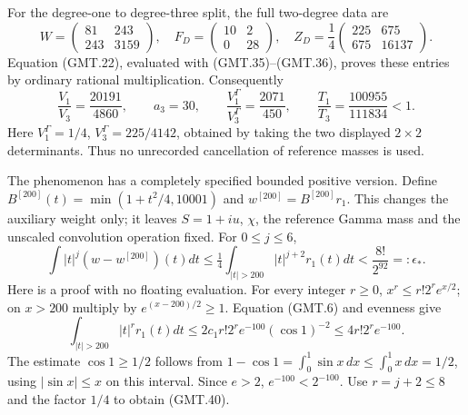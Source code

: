 \documentclass[11pt]{article}
\begin{document}
For the degree-one to degree-three split, the full two-degree data are
\[
 W=\begin{pmatrix}81&243\\243&3159\end{pmatrix},\quad
 F_D=\begin{pmatrix}10&2\\0&28\end{pmatrix},\quad
 Z_D=\frac14\begin{pmatrix}225&675\\675&16137\end{pmatrix}.
                                                                    \tag{GMT.38}
\]
Equation (GMT.22), evaluated with (GMT.35)--(GMT.36), proves these
entries by ordinary rational multiplication. Consequently
\[
 \frac{V_1}{V_3}=\frac{20191}{4860},\qquad a_3=30,
 \qquad\frac{V_1^\Gamma}{V_3^\Gamma}=\frac{2071}{450},\qquad
 \boxed{\frac{T_1}{T_3}=\frac{100955}{111834}<1.}               \tag{GMT.39}
\]
Here $V_1^\Gamma=1/4$, $V_3^\Gamma=225/4142$, obtained by
taking the two displayed $2\times2$ determinants. Thus no
unrecorded cancellation of reference masses is used.

The phenomenon has a completely specified bounded positive version.
Define $B^{[200]}(t)=\min(1+t^2/4,10001)$ and
$w^{[200]}=B^{[200]}r_1$. This changes the auxiliary weight only;
it leaves $S=1+iu$, $\chi$, the reference Gamma mass and the
unscaled convolution operation fixed. For $0\le j\le6$,
\[
 \int |t|^j(w-w^{[200]})(t)dt
 \le\tfrac14\int_{|t|>200}|t|^{j+2}r_1(t)dt
 <\frac{8!}{2^{92}}=:\epsilon_*.                              \tag{GMT.40}
\]
Here is a proof with no floating evaluation. For every integer $r\ge0$,
$x^r\le r!2^r e^{x/2}$; on $x>200$ multiply by
$e^{(x-200)/2}\ge1$. Equation (GMT.6) and evenness give
\[
 \int_{|t|>200}|t|^r r_1(t)dt
 \le 2c_1 r!2^r e^{-100}(\cos1)^{-2}
 \le4r!2^r e^{-100}.
\]
The estimate $\cos1\ge1/2$ follows from
$1-\cos1=\int_0^1\sin x\,dx\le\int_0^1x\,dx=1/2$,
using $|\sin x|\le x$ on this interval.
Since $e>2$, $e^{-100}<2^{-100}$. Use $r=j+2\le8$ and the
factor $1/4$ to obtain (GMT.40).
\end{document}
